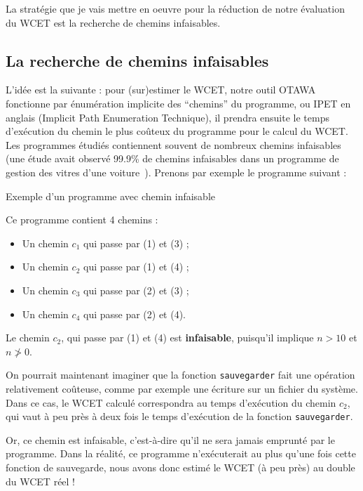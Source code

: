 \documentclass[french]{article}
\begin{document}
  La stratégie que je vais mettre en oeuvre pour la réduction de notre évaluation du WCET est la recherche de chemins infaisables.

  \subsection{La recherche de chemins infaisables}
  L'idée est la suivante : pour (sur)estimer le WCET, notre outil OTAWA fonctionne par énumération implicite des ``chemins'' du programme, ou IPET en anglais (Implicit Path Enumeration Technique), il prendra ensuite le temps d'exécution du chemin le plus coûteux du programme pour le calcul du WCET. Les programmes étudiés contiennent souvent de nombreux chemins infaisables (une étude avait observé 99.9\% de chemins infaisables dans un programme de gestion des vitres d'une voiture~\cite{wcet05}). Prenons par exemple le programme suivant :

  \begin{algorithm}
    \label{alg:1}
    \caption{Exemple d'un programme avec chemin infaisable}
  \end{algorithm}

  Ce programme contient 4 chemins :
  \begin{itemize}
    \item Un chemin $c_1$ qui passe par (1) et (3) ;
    \item Un chemin $c_2$ qui passe par (1) et (4) ;
    \item Un chemin $c_3$ qui passe par (2) et (3) ;
    \item Un chemin $c_4$ qui passe par (2) et (4).
  \end{itemize}

  Le chemin $c_2$, qui passe par (1) et (4) est \textbf{infaisable}, puisqu'il implique $n > 10$ et $n \ngtr 0$.

  On pourrait maintenant imaginer que la fonction \texttt{sauvegarder} fait une opération relativement coûteuse, comme par exemple une écriture sur un fichier du système. Dans ce cas, le WCET calculé correspondra au temps d'exécution du chemin $c_2$, qui vaut à peu près à deux fois le temps d'exécution de la fonction \texttt{sauvegarder}.

  Or, ce chemin est infaisable, c'est-à-dire qu'il ne sera jamais emprunté par le programme. Dans la réalité, ce programme n'exécuterait au plus qu'une fois cette fonction de sauvegarde, nous avons donc estimé le WCET (à peu près) au double du WCET réel !
\end{document}
